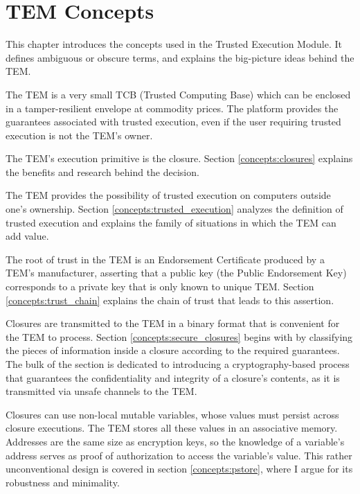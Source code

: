 \chapter{TEM Concepts}\label{concepts}

This chapter introduces the concepts used in the Trusted Execution Module. It
defines ambiguous or obscure terms, and explains the big-picture ideas
behind the TEM.

The TEM is a very small TCB (Trusted Computing Base) which can be enclosed in a
tamper-resilient envelope at commodity prices. The platform provides the
guarantees associated with trusted execution, even if the user requiring
trusted execution is not the TEM's owner.

The TEM's execution primitive is the closure. Section \ref{concepts:closures}
explains the benefits and research behind the decision.

The TEM provides the possibility of trusted execution on computers outside
one's ownership. Section \ref{concepts:trusted_execution} analyzes the
definition of trusted execution and explains the family of situations in which
the TEM can add value.

The root of trust in the TEM is an Endorsement Certificate produced by a
TEM's manufacturer, asserting that a public key (the Public Endorsement Key)
corresponds to a private key that is only known to unique TEM. Section
\ref{concepts:trust_chain} explains the chain of trust that leads to this
assertion.

Closures are transmitted to the TEM in a binary format that is convenient for
the TEM to process. Section \ref{concepts:secure_closures} begins with
by classifying the pieces of information inside a closure according to the
required guarantees. The bulk of the section is dedicated to introducing a
cryptography-based process that guarantees the confidentiality and integrity of
a closure's contents, as it is transmitted via unsafe channels to the TEM.

Closures can use non-local mutable variables, whose values must persist
across closure executions. The TEM stores all these values in an associative
memory. Addresses are the same size as encryption keys, so the knowledge of a
variable's address serves as proof of authorization to access the variable's
value. This rather unconventional design is covered in section
\ref{concepts:pstore}, where I argue for its robustness and minimality.



